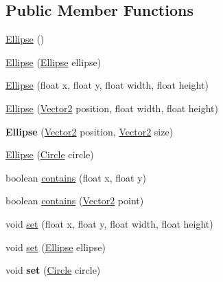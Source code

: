 \subsection*{Public Member Functions}
\begin{DoxyCompactItemize}
\item 
\hyperlink{classairhockeyjava_1_1util_1_1_ellipse_a1cfa12b1e5a66adc95909662d69b3df8}{Ellipse} ()
\item 
\hyperlink{classairhockeyjava_1_1util_1_1_ellipse_abe43bfefabae8a39d801f5aae34879b0}{Ellipse} (\hyperlink{classairhockeyjava_1_1util_1_1_ellipse}{Ellipse} ellipse)
\item 
\hyperlink{classairhockeyjava_1_1util_1_1_ellipse_a6c6752842bfee6f246906f5322763688}{Ellipse} (float x, float y, float width, float height)
\item 
\hyperlink{classairhockeyjava_1_1util_1_1_ellipse_ae817ff0092700f3ee4e304725ee734f6}{Ellipse} (\hyperlink{classairhockeyjava_1_1util_1_1_vector2}{Vector2} position, float width, float height)
\item 
\hypertarget{classairhockeyjava_1_1util_1_1_ellipse_a3536b72f3c8fd3f14d52e42e9a108267}{}{\bfseries Ellipse} (\hyperlink{classairhockeyjava_1_1util_1_1_vector2}{Vector2} position, \hyperlink{classairhockeyjava_1_1util_1_1_vector2}{Vector2} size)\label{classairhockeyjava_1_1util_1_1_ellipse_a3536b72f3c8fd3f14d52e42e9a108267}

\item 
\hyperlink{classairhockeyjava_1_1util_1_1_ellipse_a9fed769240b0346ee4c8275a8135eec0}{Ellipse} (\hyperlink{classairhockeyjava_1_1util_1_1_circle}{Circle} circle)
\item 
boolean \hyperlink{classairhockeyjava_1_1util_1_1_ellipse_aab63a6d2d635db5d9250c822e4172a9e}{contains} (float x, float y)
\item 
boolean \hyperlink{classairhockeyjava_1_1util_1_1_ellipse_a930652060e3e0a92bfea675b9a850d63}{contains} (\hyperlink{classairhockeyjava_1_1util_1_1_vector2}{Vector2} point)
\item 
void \hyperlink{classairhockeyjava_1_1util_1_1_ellipse_acdaf74182f50c098195e5242533a1730}{set} (float x, float y, float width, float height)
\item 
void \hyperlink{classairhockeyjava_1_1util_1_1_ellipse_ac47285f3ab2800d72196d81d235544ff}{set} (\hyperlink{classairhockeyjava_1_1util_1_1_ellipse}{Ellipse} ellipse)
\item 
\hypertarget{classairhockeyjava_1_1util_1_1_ellipse_a954d5767f38daa2332e84c63a4868934}{}void {\bfseries set} (\hyperlink{classairhockeyjava_1_1util_1_1_circle}{Circle} circle)\label{classairhockeyjava_1_1util_1_1_ellipse_a954d5767f38daa2332e84c63a4868934}


\end{DoxyCompactItemize}
